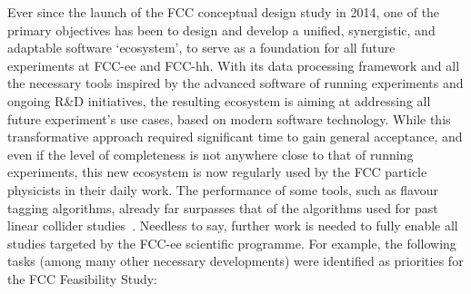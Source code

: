 Ever since the launch of the FCC conceptual design study in 2014, 
one of the primary objectives has been to design and develop a unified, 
synergistic, and adaptable software `ecosystem', 
to serve as a foundation for all future experiments at FCC-ee and FCC-hh. 
With its data processing framework and all the necessary tools 
inspired by the advanced software of running experiments and ongoing R\&D initiatives, 
the resulting ecosystem is aiming at addressing all future experiment's use cases, 
based on modern software technology. 
While this transformative approach required significant time to gain general acceptance, 
and even if the level of completeness is not anywhere close to that of running experiments, 
this new ecosystem is now regularly used by the FCC particle physicists in their daily work. 
The performance of some tools, such as flavour tagging algorithms, 
already far surpasses that of the algorithms used for past linear collider studies~\cite{ilcsoft}. 
Needless to say, further work is needed to fully enable all studies targeted by the FCC-ee scientific programme. 
For example, the following tasks (among many other necessary developments) 
were identified as priorities for the FCC Feasibility Study: 
